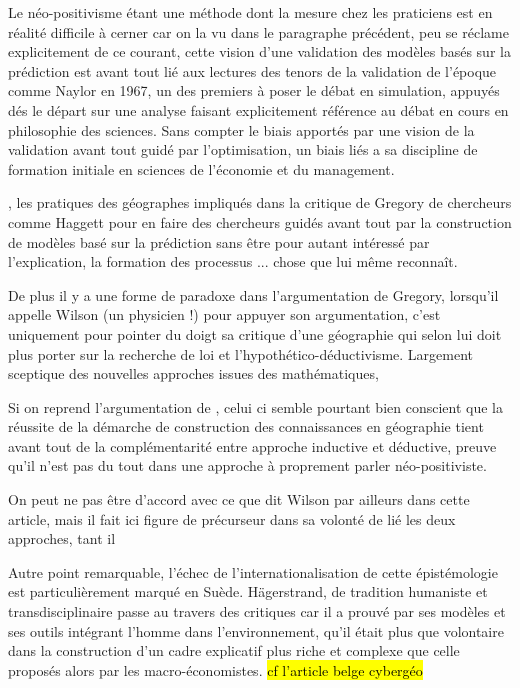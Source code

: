 Le néo-positivisme étant une méthode dont la mesure chez les praticiens est en réalité difficile à cerner car on la vu dans le paragraphe précédent, peu se réclame explicitement de ce courant, cette vision d'une validation des modèles basés sur la prédiction est avant tout lié aux lectures des tenors de la validation de l'époque comme Naylor en 1967, un des premiers à poser le débat en simulation, appuyés dés le départ sur une analyse faisant explicitement référence au débat en cours en philosophie des sciences. Sans compter le biais apportés par une vision de la validation avant tout guidé par l'optimisation, un biais liés a sa discipline de formation initiale en sciences de l'économie et du management.

,  les pratiques des géographes impliqués dans la critique de Gregory 
de chercheurs comme Haggett pour en faire des chercheurs guidés avant tout par la construction de modèles basé sur la prédiction sans être pour autant intéressé par l'explication, la formation des processus ... chose que lui même reconnaît. 

De plus il y a une forme de paradoxe dans l'argumentation de Gregory, lorsqu'il appelle Wilson (un physicien !) pour appuyer son argumentation, c'est uniquement pour pointer du doigt sa critique d'une géographie qui selon lui doit plus porter sur la recherche de loi et l'hypothético-déductivisme. Largement sceptique des nouvelles approches issues des mathématiques, 

Si on reprend l'argumentation de \textcite{Wilson1972}, celui ci semble pourtant bien conscient que la réussite de la démarche de construction des connaissances en géographie tient avant tout de la complémentarité entre approche inductive et déductive, preuve qu'il n'est pas du tout dans une approche à proprement parler néo-positiviste.






On peut ne pas être d'accord avec ce que dit Wilson par ailleurs dans cette article, mais il fait ici figure de précurseur dans sa volonté de lié les deux approches, tant il 

Autre point remarquable, l'échec de l'internationalisation de cette épistémologie est particulièrement marqué en Suède. Hägerstrand, de tradition humaniste et transdisciplinaire \autocite{Bailly2000} passe au travers des critiques car il a prouvé par ses modèles et ses outils intégrant l'homme dans l'environnement, qu'il était plus que volontaire dans la construction d'un cadre explicatif plus riche et complexe que celle proposés alors par les macro-économistes. \hl{cf l'article belge cybergéo}

